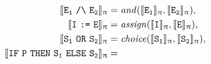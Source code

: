 \documentclass[a4paper,openany]{book}
\newcommand{\BS}{\char`\\}
\begin{document}
\begin{PiDen}
{\begin{align}
%
\label{eq:and}\llbracket \mathtt{E_{\mathtt{1}} ~\mbox{\tt/\BS}~ E_{\mathtt{2}}} \rrbracket_\uppi  & =  
	\mathit{and(\llbracket \mathtt{E_{\mathtt{1}}}\rrbracket_\uppi, \llbracket \mathtt{E}_{\mathtt{2}} \rrbracket_\uppi)}, \\
%
%
%
%
%     
\label{eq:assign}\llbracket \mathtt{I ~\mbox{\tt :=}~ E}\rrbracket_\uppi  & =  
	\mathit{assign(\llbracket \mathtt{I} \rrbracket_\uppi, \llbracket \mathtt{E} \rrbracket_\uppi)}, \\
%
%
%
%
\llbracket \mathtt{S_{\mathtt{1}} ~\mbox{\tt OR}~ S_{\mathtt{2}}} \rrbracket_\uppi  & =  
	\mathit{choice(\llbracket \mathtt{S_{\mathtt{1}}} \rrbracket_\uppi, \llbracket \mathtt{S_{\mathtt{2}}} \rrbracket_\uppi)} , \\
%
%
%
%
%
%
%
\llbracket \mathtt{\mbox{\tt IF}~ P ~\mbox{\tt THEN}~ S_{\mathtt{1}} ~\mbox{\tt ELSE}~ S_{\mathtt{2}}} \rrbracket_\uppi  & =  

\end{align}}
\end{PiDen}
\end{document}
